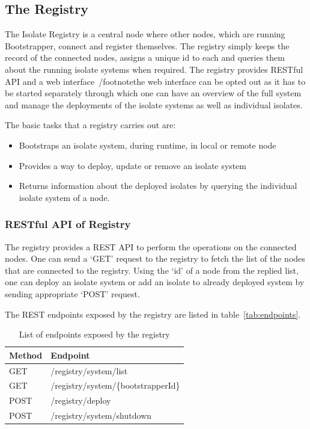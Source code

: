 \subsection{The Registry}
\label{subsec:registry}
The Isolate Registry is a central node where other nodes, which are running Bootstrapper, connect and register themselves. The registry simply keeps the record of the connected nodes, assigns a unique id to each and queries them about the running isolate systems when required. The registry provides RESTful API and a web interface~/footnote{the web interface can be opted out as it has to be started separately} through which one can have an overview of the full system and manage the deployments of the isolate systems as well as individual isolates.

The basic tasks that a registry carries out are:
\begin{itemize}
  \item Bootstraps an isolate system, during runtime, in local or remote node
  \item Provides a way to deploy, update or remove an isolate system
  \item Returns information about the deployed isolates by querying the individual isolate system of a node.
\end{itemize}

  \subsubsection{RESTful API of Registry}
  \label{subsec:restApi}
  The registry provides a REST API to perform the operations on the connected nodes. One can send a ‘GET’ request to the registry to fetch the list of the nodes that are connected to the registry. Using the ‘id’ of a node from the replied list, one can deploy an isolate system or add an isolate to already deployed system by sending appropriate ‘POST’ request.

  The REST endpoints exposed by the registry are listed in table~\autoref{tab:endpoints}.
  \begin{table}[htsb]
    \caption[Endpoints exposed by the registry]{List of endpoints exposed by the registry}\label{tab:endpoints}
    \centering
    \begin{tabular}{l l}
      \toprule
        Method  & Endpoint \\
      \midrule
        GET &  /registry/system/list\\
        GET & /registry/system/\{bootstrapperId\} \\
        POST & /registry/deploy \\
        POST & /registry/system/shutdown \\
      \bottomrule
    \end{tabular}
  \end{table}

